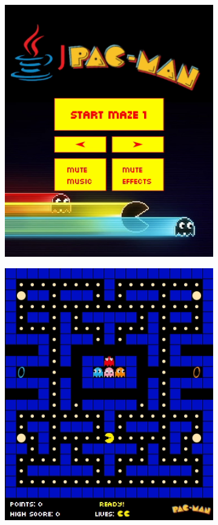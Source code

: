 \documentclass[12pt,a4paper]{report}
\begin{document}
\begin{figure}[hb!]
\begin{subfigure}{.32\textwidth}
  \centering
  \includegraphics[width=.95\linewidth]{menupanel}
  \caption{}
  \label{fig:snap1}
\end{subfigure}%
\begin{subfigure}{.32\textwidth}
  \centering
  \includegraphics[width=.95\linewidth]{maze1}

\end{subfigure}
\end{figure}
\end{document}
